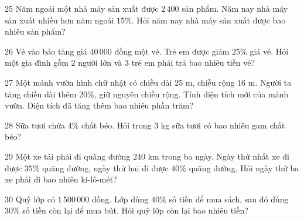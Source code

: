\gap
\begin{probbox}{25}{\relax}
Năm ngoái một nhà máy sản xuất được $2\,400$ sản phẩm. Năm nay nhà máy sản xuất nhiều hơn năm ngoái $15\%$. Hỏi năm nay nhà máy sản xuất được bao nhiêu sản phẩm?
\end{probbox}
\gap
\begin{probbox}{26}{\relax}
Vé vào bảo tàng giá $40\,000$ đồng một vé. Trẻ em được giảm $25\%$ giá vé. Hỏi một gia đình gồm $2$ người lớn và $3$ trẻ em phải trả bao nhiêu tiền vé?
\end{probbox}
\gap
\begin{probbox}{27}{\relax}
Một mảnh vườn hình chữ nhật có chiều dài $25$ m, chiều rộng $16$ m. Người ta tăng chiều dài thêm $20\%$, giữ nguyên chiều rộng. Tính diện tích mới của mảnh vườn. Diện tích đã tăng thêm bao nhiêu phần trăm?
\end{probbox}
\gap
\begin{probbox}{28}{\relax}
Sữa tươi chứa $4\%$ chất béo. Hỏi trong $3$ kg sữa tươi có bao nhiêu gam chất béo?
\end{probbox}
\gap
\begin{probbox}{29}{\relax}
Một xe tải phải đi quãng đường $240$ km trong ba ngày. Ngày thứ nhất xe đi được $35\%$ quãng đường, ngày thứ hai đi được $40\%$ quãng đường. Hỏi ngày thứ ba xe phải đi bao nhiêu ki-lô-mét?
\end{probbox}
\gap
\begin{probbox}{30}{\relax}
Quỹ lớp có $1\,500\,000$ đồng. Lớp dùng $40\%$ số tiền để mua sách, sau đó dùng $30\%$ số tiền còn lại để mua bút. Hỏi quỹ lớp còn lại bao nhiêu tiền?
\end{probbox}
